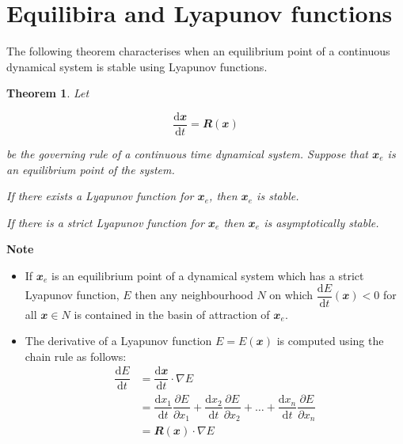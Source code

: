 \documentclass[
  a4paper,
  oneside,
  final]{krantz}
\providecommand{\tightlist}{%
  \setlength{\itemsep}{0pt}\setlength{\parskip}{0pt}}
\renewcommand{\d}{\mathrm{d}}
\renewcommand{\v}[1]{{\mathbfit{#1}}}
\newcommand{\pder}[2]{\dfrac{\partial #1}{\partial#2}}
\newcommand{\der}[2]{\dfrac{\d #1}{\d #2}}
\newtheorem{theorem}{Theorem}[chapter]
\theoremstyle{definition}
\theoremstyle{definition}
\theoremstyle{definition}
\theoremstyle{definition}
\theoremstyle{remark}
\begin{document}
\hypertarget{Equilibria-and-lyapunov-functions}{%
\section{Equilibira and Lyapunov functions}\label{Equilibria-and-lyapunov-functions}}

The following theorem characterises when an equilibrium point of a continuous dynamical system is stable using Lyapunov functions.

\begin{theorem}
\protect\hypertarget{thm:Lyapunov-stability-cont}{}\label{thm:Lyapunov-stability-cont}Let

\[ \der{\v{x}}{t} = \v{R}(\v{x})\]

be the governing rule of a continuous time dynamical system. Suppose that \(\v{x}_{e}\) is an equilibrium point of the system.

If there exists a Lyapunov function for \(\v{x}_{e}\), then \(\v{x}_{e}\) is stable.

If there is a strict Lyapunov function for \(\v{x}_{e}\) then \(\v{x}_{e}\) is asymptotically stable.
\end{theorem}

\begin{palegreenbox}

\begin{center}
\textbf{Note}

\end{center}

\begin{itemize}
\tightlist
\item
  If \(\v{x}_{e}\) is an equilibrium point of a dynamical system which has a strict Lyapunov function, \(E\) then any neighbourhood \(N\) on which \(\der{E}{t} (\v{x}) < 0\) for all \(\v{x} \in N\) is contained in the basin of attraction of \(\v{x}_{e}\).
\item
  The derivative of a Lyapunov function \(E = E(\v{x})\) is computed using the chain rule as follows:
  \begin{align*}
    \der{E}{t} &= \der{\v{x}}{t}\cdot \nabla E \\
               &= \der{x_1}{t} \pder{E}{x_1} + \der{x_2}{t} \pder{E}{x_2} + \ldots + \der{x_n}{t} \pder{E}{x_n}\\
               & = \v{R}(\v{x}) \cdot \nabla E
  \end{align*}
\end{itemize}

\end{palegreenbox}
\end{document}
